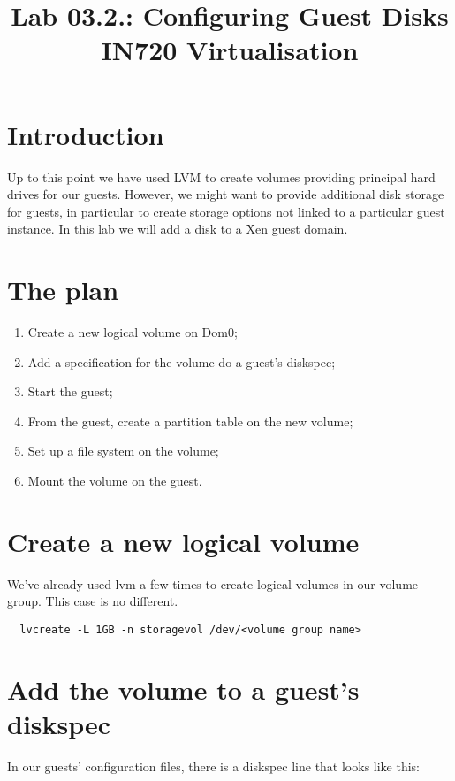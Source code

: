\documentclass{article}
\begin{document}
\title{Lab 03.2.: Configuring Guest Disks\\ IN720 Virtualisation}
\date{}
\maketitle

\section*{Introduction}
Up to this point we have used LVM to create volumes providing principal hard drives for our guests. However, we might want to provide additional disk storage for guests, in particular to create storage options not linked to a particular guest instance. In this lab we will add a disk to a Xen guest domain.

\section{The plan}


\begin{enumerate}
  \item Create a new logical volume on Dom0;
  \item Add a specification for the volume do a guest's diskspec;
  \item Start the guest;
  \item From the guest, create a partition table on the new volume;
  \item Set up a file system on the volume;
  \item Mount the volume on the guest.
\end{enumerate}

\section{Create a new logical volume}
We've already used lvm a few times to create logical volumes in our volume group. This case is no different.

\begin{verbatim}
  lvcreate -L 1GB -n storagevol /dev/<volume group name>
\end{verbatim}

\section{Add the volume to a guest's diskspec}

In our guests' configuration files, there is a diskspec line that looks like this:
\end{document}
